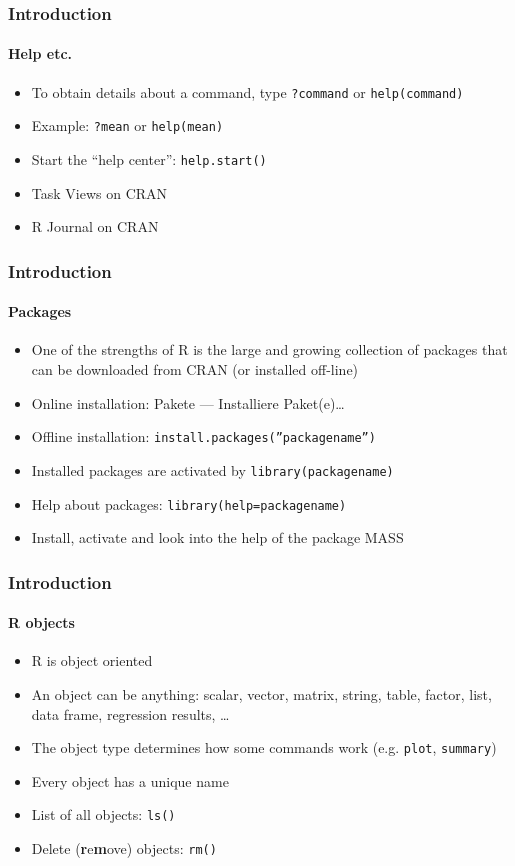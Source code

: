 \documentclass[title={Introduction to R}, author={Mutschler and Zaharieva}, inst={Institute for Econometrics and Empirical Economics}]{beamer}
\begin{document}
\begin{frame}
\frametitle{Introduction}
\framesubtitle{Help etc.}
\begin{itemize}
\item To obtain details about a command, type \newline
\texttt{?command} \newline
or \newline
\texttt{help(command)}
\item Example: \texttt{?mean} or \texttt{help(mean)}
\item Start the \textquotedblleft help center\textquotedblright : \texttt{help.start()}
\item Task Views on CRAN
\item R Journal on CRAN
\end{itemize}
\end{frame}


\begin{frame}
\frametitle{Introduction}
\framesubtitle{Packages}
\begin{itemize}
\item One of the strengths of R is the large and growing collection of packages that can be downloaded from CRAN (or installed off-line)
\item Online installation: Pakete --- Installiere Paket(e)\ldots
\item Offline installation: \texttt{install.packages(''packagename'')}
\item Installed packages are activated by \texttt{library(packagename)}
\item Help about packages: \texttt{library(help=packagename)}
\item Install, activate and look into the help of the package MASS
\end{itemize}
\end{frame}


\begin{frame}
\frametitle{Introduction}
\framesubtitle{R objects}
\begin{itemize}
\item R is object oriented
\item An object can be anything: scalar, vector, matrix, string, table, factor, list, data frame, regression results, \ldots
\item The object type determines how some commands work \newline
(e.g. \texttt{plot}, \texttt{summary})
\item Every object has a unique name
\item List of all objects: \texttt{ls()}
\item Delete (\textbf{r}e\textbf{m}ove) objects: \texttt{rm()}
\end{itemize}
\end{frame}
\end{document}
